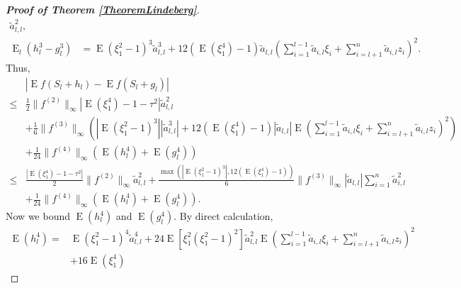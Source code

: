\documentclass[11pt]{article}
\DeclareMathOperator{\myE}{E}
\theoremstyle{plain}
\theoremstyle{definition}
\theoremstyle{remark}
\begin{document}
\begin{appendices}
\begin{proof}[\textbf{Proof of Theorem \ref{TheoremLindeberg}}]
\begin{equation*}
\begin{split}
        \tilde a_{l,l}^2
        ,
        \\
        \myE_l (h_l^3-g_l^3)&= 
        \myE (\xi_1^2-1)^3
        \tilde a_{l,l}^3 
        +
        12 (\myE (\xi_1^4) - 1) \tilde a_{l,l} \left( \sum_{i=1}^{l-1} \tilde a_{i,l} \xi_i + \sum_{i=l+1}^n \tilde a_{i,l} z_i    \right)^2 
        .
    \end{split}
\end{equation*}
Thus,
\begin{equation}\label{eq:Lin1}
        \begin{split}
             &\left| \myE f(S_{l}+h_{l})-\myE f(S_{l}+g_{l})\right|
             \\
\leq&
\frac{1}{2}
\|f^{(2)}\|_\infty
\left|
\myE(\xi_1^4)-1
            -\tau^2
\right|
        \tilde a_{l,l}^2
        \\
            &+
            \frac{1}{6} \|f^{(3)}\|_{\infty}
\left(
    \left|\myE (\xi_1^2-1)^3\right|
        |\tilde a_{l,l}^3 |
        +
        12 (\myE (\xi_1^4)-1) |\tilde a_{l,l}|
            \myE 
            \left( \sum_{i=1}^{l-1} \tilde a_{i,l} \xi_i + \sum_{i=l+1}^n \tilde a_{i,l} z_i    \right)^2 
    \right)
    \\
            &+
            \frac{1}{24} \|f^{(4)} \|_{\infty} \left(\myE (h_{l}^4)+\myE (g_{l}^4)\right)
            \\
\leq &
\frac{
\left|
\myE (\xi_1^4)-1
            -
            \tau^2
\right|
}{2}
\|f^{(2)}\|_\infty
        \tilde a_{l,l}^2
            +
            \frac{
            \max\left(
    \left|\myE (\xi_1^2-1)^3\right|
            ,
12 (\myE (\xi_1^4)-1)
        \right)
            }{6} \|f^{(3)}\|_\infty
|\tilde a_{l,l}|
         \sum_{i=1}^{n} \tilde a_{i,l}^2 
         \\
            &+
            \frac{1}{24} \|f^{(4)} \|_{\infty} \left(\myE (h_{l}^4)+\myE (g_{l}^4)\right)
            .
        \end{split}
    \end{equation}
    Now we bound $\myE (h_l^4)$ and $\myE (g_l^4)$.
    By direct calculation,
\begin{equation*}
    \begin{split}
        \myE (h_l^4)
        =&
        \myE (\xi_1^2 - 1)^4 \tilde a_{l,l}^4
        + 24 \myE [ \xi_1^2(\xi_1^2 -1)^2]
        \tilde a_{l,l}^2
        \myE \left( 
        \sum_{i=1}^{l-1} \tilde a_{i,l} \xi_i 
        +\sum_{i =l +1}^n \tilde a_{i,l} z_i 
        \right)^2
        \\
        &+
        16 \myE (\xi_1^4 )

\end{split}
\end{equation*}
\end{proof}
\end{appendices}
\end{document}
